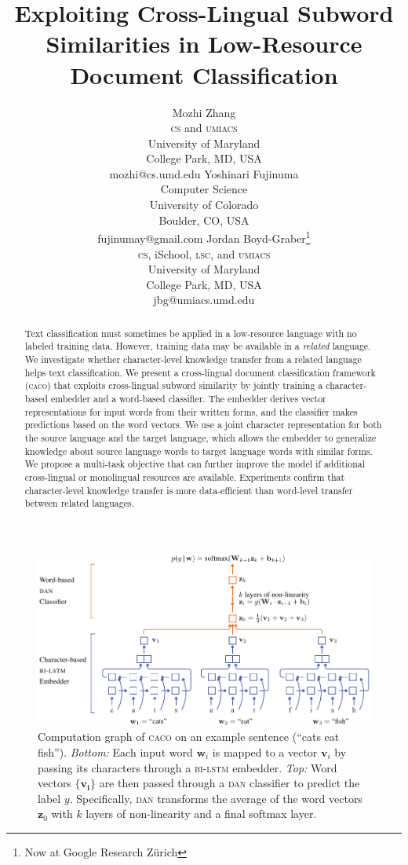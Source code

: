 \documentclass[letterpaper]{article} %
\title{Exploiting Cross-Lingual Subword Similarities in Low-Resource Document
Classification}
\author{Mozhi Zhang \\
  \textsc{cs} and \textsc{umiacs} \\
  University of Maryland \\
  College Park, MD, USA \\
  mozhi@cs.umd.edu
  \And
  Yoshinari Fujinuma \\
  Computer Science \\
  University of Colorado \\
  Boulder, CO, USA \\
  fujinumay@gmail.com
  \And
  Jordan Boyd-Graber\thanks{Now at Google Research Z\"urich} \\
  \textsc{cs}, iSchool, \textsc{lsc}, and \textsc{umiacs}\\
  University of Maryland \\
  College Park, MD, USA \\
  jbg@umiacs.umd.edu \\}
\newcommand{\abr}[1]{\textsc{#1}}
\newcommand{\vect}[1]{\bm{\mathbf{#1}}}
\newcommand{\name}[0]{\textsc{caco}}
\begin{document}
\maketitle
\begin{abstract}

  Text classification must sometimes be applied in a low-resource language with
  no labeled training data.
  However, training data may be available in a \emph{related} language.
  We investigate whether character-level knowledge transfer from a related
  language helps text classification.
  We present a cross-lingual document classification framework (\name{}) that
  exploits cross-lingual subword similarity by jointly training a
  character-based embedder and a word-based classifier.
  The embedder derives vector representations for input words from their
  written forms, and the classifier makes predictions based on the word
  vectors.
  We use a joint character representation for both the source language and the
  target language, which allows the embedder to generalize knowledge about
  source language words to target language words with similar forms.
  We propose a multi-task objective that can further improve the model if
  additional cross-lingual or monolingual resources are available.
  Experiments confirm that character-level knowledge transfer is more
  data-efficient than word-level transfer between related languages.

\end{abstract}

\begin{figure}
  \centering
  \includegraphics[width=.9\textwidth]{architecture.pdf}
  \caption{\label{fig:model} Computation graph of \name{} on an example
  sentence (``cats eat fish'').
  \emph{Bottom:} Each input word $\vect{w}_i$ is mapped to a vector $\vect{v}_i$
  by passing its characters through a \abr{bi-lstm} embedder.
  \emph{Top:} Word vectors $\{\vect{v_i}\}$ are then passed through a \abr{dan}
  classifier to predict the label $y$.
  Specifically, \abr{dan} transforms the average of the word vectors
  $\vect{z}_0$ with $k$ layers of non-linearity and a final softmax layer.}
\end{figure}
\end{document}
